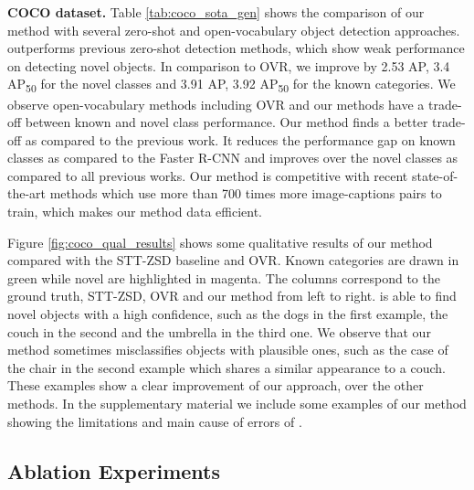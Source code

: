 \textbf{COCO dataset.} Table \ref{tab:coco_sota_gen} shows the comparison of our method with several zero-shot and open-vocabulary object detection approaches. \modelname outperforms previous zero-shot detection methods, which show weak performance on detecting novel objects. In comparison to OVR, we improve by 2.53 AP, 3.4 AP\textsubscript{50} for the novel classes and 3.91 AP, 3.92 AP\textsubscript{50} for the known categories. We observe open-vocabulary methods including OVR and our methods have a trade-off between known and novel class performance. Our method finds a better trade-off as compared to the previous work. It reduces the performance gap on known classes as compared to the Faster R-CNN and improves over the novel classes as compared to all previous works. Our method is competitive with recent state-of-the-art methods which use more than 700 times more image-captions pairs to train, which makes our method data efficient.





Figure \ref{fig:coco_qual_results} shows some qualitative results of our method compared with the STT-ZSD baseline and OVR. Known categories are drawn in green while novel are highlighted in magenta. The columns correspond to the ground truth, STT-ZSD, OVR and our method from left to right.
\modelname is able to find novel objects with a high confidence, such as the dogs in the first example, the couch in the second and the umbrella in the third one. We observe that our method sometimes misclassifies objects with plausible ones, such as the case of the chair in the second example which shares a similar appearance to a couch. 
These examples show a clear improvement of our approach, over the other methods.
In the supplementary material we include some examples of our method showing the limitations and main cause of errors of \modelname.




\subsection{Ablation Experiments} \label{sec:ablations}





